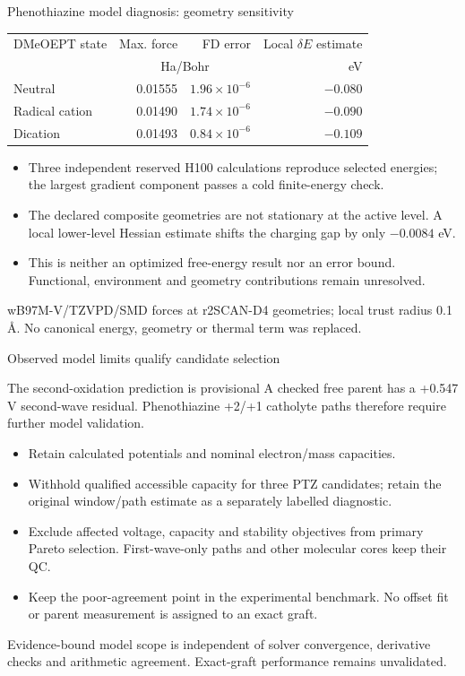 \begin{frame}{Phenothiazine model diagnosis: geometry sensitivity}
  \small
  \begin{center}
  \begin{tabular}{lrrr}
    \toprule
    DMeOEPT state & Max. force & FD error & Local $\delta E$ estimate \\
    & \multicolumn{2}{c}{Ha/Bohr} & eV \\
    \midrule
    Neutral & 0.01555 & $1.96\times10^{-6}$ & $-0.080$ \\
    Radical cation & 0.01490 & $1.74\times10^{-6}$ & $-0.090$ \\
    Dication & 0.01493 & $0.84\times10^{-6}$ & $-0.109$ \\
    \bottomrule
  \end{tabular}
  \end{center}
  \begin{itemize}
    \item Three independent reserved H100 calculations reproduce selected energies;
      the largest gradient component passes a cold finite-energy check.
    \item The declared composite geometries are not stationary at the active level.
      A local lower-level Hessian estimate shifts the charging gap by only $-0.0084$ eV.
    \item This is neither an optimized free-energy result nor an error bound.
      Functional, environment and geometry contributions remain unresolved.
  \end{itemize}
  \vfill\scriptsize wB97M-V/TZVPD/SMD forces at r2SCAN-D4 geometries; local trust
  radius 0.1 \AA. No canonical energy, geometry or thermal term was replaced.
\end{frame}

\begin{frame}{Observed model limits qualify candidate selection}
  \begin{block}{The second-oxidation prediction is provisional}
    A checked free parent has a +0.547 V second-wave residual.
    Phenothiazine +2/+1 catholyte paths therefore require further model validation.
  \end{block}
  \begin{itemize}
    \item Retain calculated potentials and nominal electron/mass capacities.
    \item Withhold qualified accessible capacity for three PTZ candidates;
      retain the original window/path estimate as a separately labelled diagnostic.
    \item Exclude affected voltage, capacity and stability objectives from primary
      Pareto selection. First-wave-only paths and other molecular cores keep their QC.
    \item Keep the poor-agreement point in the experimental benchmark. No offset fit
      or parent measurement is assigned to an exact graft.
  \end{itemize}
  \vfill\scriptsize Evidence-bound model scope is independent of solver convergence,
  derivative checks and arithmetic agreement. Exact-graft performance remains unvalidated.
\end{frame}

